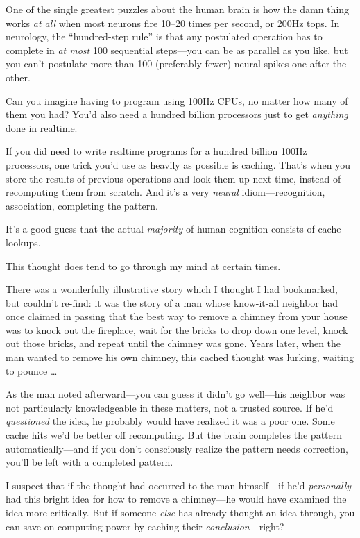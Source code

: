 {
 One of the single greatest puzzles about the human brain is how
the damn thing works \textit{at all} when most neurons fire 10--20
times per second, or 200Hz tops. In neurology, the
``hundred-step rule'' is that any
postulated operation has to complete in \textit{at most} 100 sequential
steps---you can be as parallel as you like, but you
can't postulate more than 100 (preferably fewer) neural
spikes one after the other. }

{
 Can you imagine having to program using 100Hz CPUs, no matter how
many of them you had? You'd also need a hundred billion
processors just to get \textit{anything} done in realtime.}

{
 If you did need to write realtime programs for a hundred billion
100Hz processors, one trick you'd use as heavily as
possible is caching. That's when you store the results
of previous operations and look them up next time, instead of
recomputing them from scratch. And it's a very
\textit{neural} idiom---recognition, association, completing the
pattern.}

{
 It's a good guess that the actual
\textit{majority} of human cognition consists of cache lookups.}

{
 This thought does tend to go through my mind at certain times.}

{
 There was a wonderfully illustrative story which I thought I had
bookmarked, but couldn't re-find: it was the story of a
man whose know-it-all neighbor had once claimed in passing that the
best way to remove a chimney from your house was to knock out the
fireplace, wait for the bricks to drop down one level, knock out those
bricks, and repeat until the chimney was gone. Years later, when the
man wanted to remove his own chimney, this cached thought was lurking,
waiting to pounce \ldots}

{
 As the man noted afterward---you can guess it
didn't go well---his neighbor was not particularly
knowledgeable in these matters, not a trusted source. If
he'd \textit{questioned} the idea, he probably would
have realized it was a poor one. Some cache hits we'd
be better off recomputing. But the brain completes the pattern
automatically---and if you don't consciously realize
the pattern needs correction, you'll be left with a
completed pattern.}

{
 I suspect that if the thought had occurred to the man himself---if
he'd \textit{personally} had this bright idea for how
to remove a chimney---he would have examined the idea more critically.
But if someone \textit{else} has already thought an idea through, you
can save on computing power by caching their
\textit{conclusion}{}---right?}

